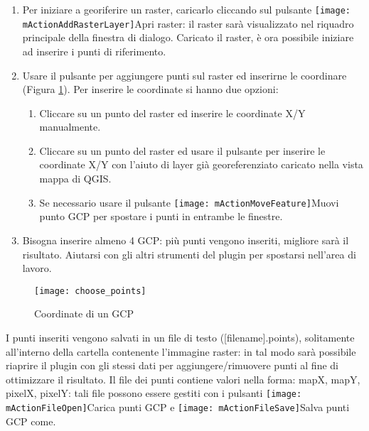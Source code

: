 \begin{enumerate}
\item Per iniziare a georiferire un raster, caricarlo cliccando sul pulsante
\texttt{[image: mActionAddRasterLayer]}{Apri raster}: il raster 
sarà visualizzato  nel riquadro principale della finestra di dialogo.
Caricato il raster, è ora possibile iniziare ad inserire i punti di riferimento.
\item Usare il pulsante  per 
aggiungere punti sul raster ed inserirne le coordinare (Figura \ref{fig:choose_points}). 
Per inserire le coordinate si hanno due opzioni:

\begin{enumerate}
\item Cliccare su un punto del raster ed inserire le coordinate X/Y manualmente.
\item Cliccare su un punto del raster ed usare il pulsante  
per inserire le coordinate X/Y con l'aiuto di layer già georeferenziato caricato 
nella vista mappa di QGIS.
\item Se necessario usare il pulsante \texttt{[image: mActionMoveFeature]}{Muovi punto GCP}
per spostare i punti in entrambe le finestre.
\end{enumerate}
\item Bisogna inserire almeno 4 GCP: più punti vengono inseriti, migliore sarà il risultato. 
Aiutarsi con gli altri strumenti del plugin per spostarsi nell'area di lavoro.
\end{enumerate}

\begin{figure}[ht]
\centering
  \texttt{[image: choose\_points]}
  \caption{Coordinate di un GCP \nixcaption}\label{fig:choose_points}
\end{figure}

I punti inseriti vengono salvati in un file di testo ([filename].points), solitamente 
all'interno della cartella contenente l'immagine raster: in tal modo sarà possibile 
riaprire il plugin con gli stessi dati per aggiungere/rimuovere punti al fine di 
ottimizzare il risultato. 
Il file dei punti contiene valori nella forma: mapX, mapY, pixelX, pixelY: tali file 
possono essere gestiti con i pulsanti \texttt{[image: mActionFileOpen]}{Carica punti GCP}
e \texttt{[image: mActionFileSave]}{Salva punti GCP come}. 

\label{georeferencer_transformation}

